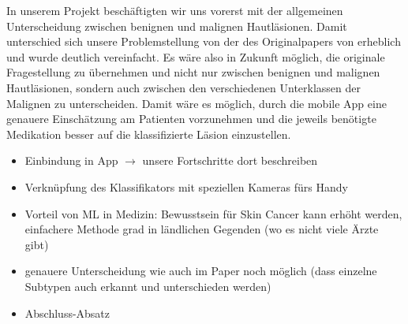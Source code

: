 In unserem Projekt beschäftigten wir uns vorerst mit der allgemeinen Unterscheidung zwischen benignen und malignen Hautläsionen. Damit unterschied sich unsere Problemstellung von der des Originalpapers von \citet{esteva2017dermatologist} erheblich und wurde deutlich vereinfacht. Es wäre also in Zukunft möglich, die originale Fragestellung zu übernehmen und nicht nur zwischen benignen und malignen Hautläsionen, sondern auch zwischen den verschiedenen Unterklassen der Malignen zu unterscheiden. Damit wäre es möglich, durch die mobile App eine genauere Einschätzung am Patienten vorzunehmen und die jeweils benötigte Medikation besser auf die klassifizierte Läsion einzustellen.
 

\color{red}
\begin{itemize}
	\item[\checkmark] Einbindung in App $\rightarrow$ unsere Fortschritte dort beschreiben
	\item[\checkmark] Verknüpfung des Klassifikators mit speziellen Kameras fürs Handy
	\item[\checkmark] Vorteil von ML in Medizin: Bewusstsein für Skin Cancer kann erhöht werden, einfachere Methode grad in ländlichen Gegenden (wo es nicht viele Ärzte gibt)
	\item[\checkmark] genauere Unterscheidung wie auch im Paper noch möglich (dass einzelne Subtypen auch erkannt und unterschieden werden)
	\item Abschluss-Absatz

\end{itemize}
\color{black}